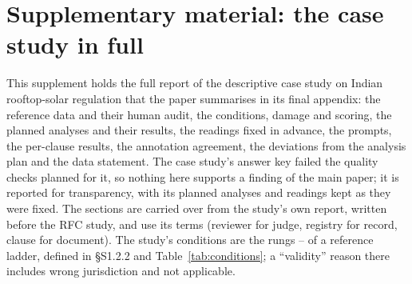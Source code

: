 \setcounter{section}{0}\setcounter{subsection}{0}\setcounter{table}{0}\setcounter{figure}{0}
\renewcommand{\thesection}{S\arabic{section}}
\renewcommand{\thetable}{S\arabic{table}}
\renewcommand{\thefigure}{S\arabic{figure}}
\renewcommand{\theHsection}{S\arabic{section}}
\renewcommand{\theHtable}{S\arabic{table}}
\renewcommand{\theHfigure}{S\arabic{figure}}
\section*{Supplementary material: the case study in full}
\noindent This supplement holds the full report of the descriptive case study on Indian rooftop-solar regulation that
the paper summarises in its final appendix: the reference data and their human audit, the conditions, damage and
scoring, the planned analyses and their results, the readings fixed in advance, the prompts, the per-clause results,
the annotation agreement, the deviations from the analysis plan and the data statement. The case study's answer key
failed the quality checks planned for it, so nothing here supports a finding of the main paper; it is reported for
transparency, with its planned analyses and readings kept as they were fixed. The sections are carried over from the
study's own report, written before the RFC study, and use its terms (reviewer for judge, registry for record, clause
for document). The study's conditions are the rungs -- of a reference ladder, defined in \S S1.2.2 and
Table~\ref{tab:conditions}; a ``validity'' reason there includes wrong jurisdiction and not applicable.



